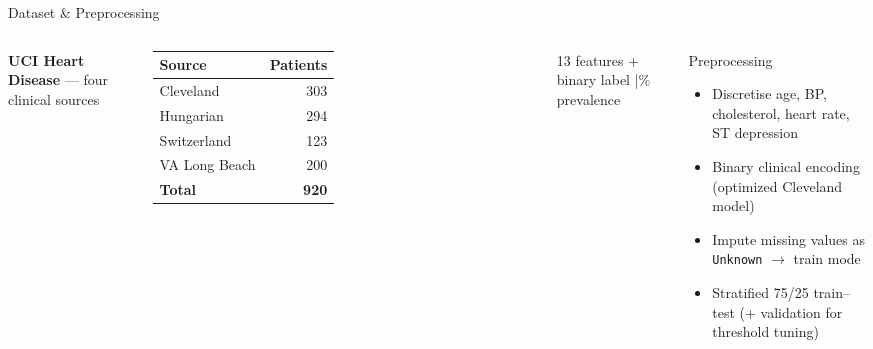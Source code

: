 \documentclass[aspectratio=169,11pt]{beamer}
\begin{document}
\begin{frame}{Dataset \& Preprocessing}
  \begin{columns}[T]
    \textbf{UCI Heart Disease} --- four clinical sources
    \vspace{0.3em}
    \begin{table}
      \begin{tabular}{@{}lr@{}}
        \toprule
        Source & Patients \\
        \midrule
        Cleveland & 303 \\
        Hungarian & 294 \\
        Switzerland & 123 \\
        VA Long Beach & 200 \\
        \midrule
        \textbf{Total} & \textbf{920} \\
        \bottomrule
      \end{tabular}
    \end{table}
    \small 13 features + binary label \quad|\% prevalence
    \begin{block}{Preprocessing}
      \begin{itemize}
        \item Discretise age, BP, cholesterol, heart rate, ST depression
        \item Binary clinical encoding (optimized Cleveland model)
        \item Impute missing values as \texttt{Unknown} $\rightarrow$ train mode
        \item Stratified 75/25 train--test (+ validation for threshold tuning)
      \end{itemize}
    \end{block}
  \end{columns}
\end{frame}
\end{document}
